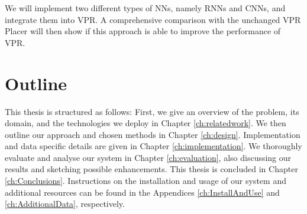 We will implement two different types of \glspl{NN}, namely \glspl{RNN} and \glspl{CNN}, and integrate them into \gls{VPR}. A comprehensive comparison with the unchanged \gls{VPR} Placer will then show if this approach is able to improve the performance of \gls{VPR}.

\section{Outline}

This thesis is structured as follows: First, we give an overview of the problem, its domain, and the technologies we deploy in Chapter \ref{ch:relatedwork}. We then outline our approach and chosen methods in Chapter \ref{ch:design}. Implementation and data specific details are given in Chapter \ref{ch:implementation}. We thoroughly evaluate and analyse our system in Chapter \ref{ch:evaluation}, also discussing our results and sketching possible enhancements. This thesis is concluded in Chapter \ref{ch:Conclusions}. Instructions on the installation and usage of our system and additional resources can be found in the Appendices \ref{ch:InstallAndUse} and \ref{ch:AdditionalData}, respectively.